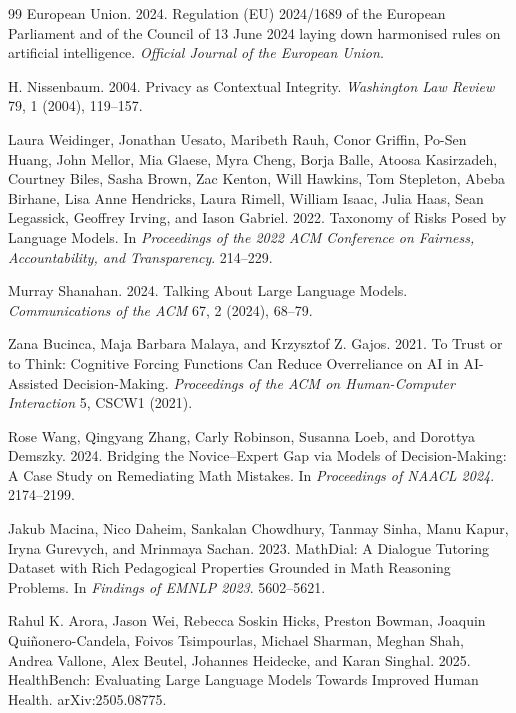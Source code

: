 \documentclass[manuscript,review,anonymous]{acmart}
\begin{document}
\begin{thebibliography}{99}
European Union. 2024. Regulation (EU) 2024/1689 of the European Parliament and of the Council of 13 June 2024 laying down harmonised rules on artificial intelligence. \textit{Official Journal of the European Union}.

H. Nissenbaum. 2004.
Privacy as Contextual Integrity.
\textit{Washington Law Review} 79, 1 (2004), 119--157.

Laura Weidinger, Jonathan Uesato, Maribeth Rauh, Conor Griffin, Po-Sen Huang, John Mellor, Mia Glaese, Myra Cheng, Borja Balle, Atoosa Kasirzadeh, Courtney Biles, Sasha Brown, Zac Kenton, Will Hawkins, Tom Stepleton, Abeba Birhane, Lisa Anne Hendricks, Laura Rimell, William Isaac, Julia Haas, Sean Legassick, Geoffrey Irving, and Iason Gabriel. 2022. Taxonomy of Risks Posed by Language Models. In \textit{Proceedings of the 2022 ACM Conference on Fairness, Accountability, and Transparency}. 214--229.

Murray Shanahan. 2024. Talking About Large Language Models. \textit{Communications of the ACM} 67, 2 (2024), 68--79.

Zana Bucinca, Maja Barbara Malaya, and Krzysztof Z. Gajos. 2021. To Trust or to Think: Cognitive Forcing Functions Can Reduce Overreliance on AI in AI-Assisted Decision-Making. \textit{Proceedings of the ACM on Human-Computer Interaction} 5, CSCW1 (2021).

Rose Wang, Qingyang Zhang, Carly Robinson, Susanna Loeb, and Dorottya Demszky. 2024.
Bridging the Novice--Expert Gap via Models of Decision-Making: A Case Study on Remediating Math Mistakes.
In \textit{Proceedings of NAACL 2024}. 2174--2199.

Jakub Macina, Nico Daheim, Sankalan Chowdhury, Tanmay Sinha, Manu Kapur, Iryna Gurevych, and Mrinmaya Sachan. 2023.
MathDial: A Dialogue Tutoring Dataset with Rich Pedagogical Properties Grounded in Math Reasoning Problems.
In \textit{Findings of EMNLP 2023}. 5602--5621.

Rahul K. Arora, Jason Wei, Rebecca Soskin Hicks, Preston Bowman, Joaquin Qui\~nonero-Candela, Foivos Tsimpourlas, Michael Sharman, Meghan Shah, Andrea Vallone, Alex Beutel, Johannes Heidecke, and Karan Singhal. 2025.
HealthBench: Evaluating Large Language Models Towards Improved Human Health.
arXiv:2505.08775.

\end{thebibliography}
\end{document}
